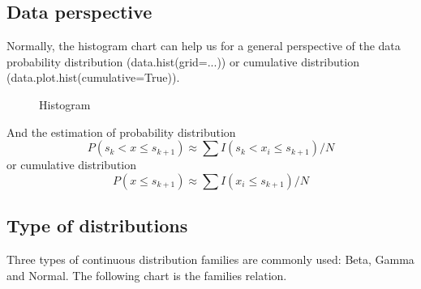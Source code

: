 \documentclass[UTF8]{article} %
\begin{document}
\subsection{Data perspective}
Normally, the histogram chart can help us for a general perspective of the data probability distribution (data.hist(grid=...)) or cumulative distribution (data.plot.hist(cumulative=True)).
\begin{figure}[htb]
\centering
{}
\caption{Histogram}
\label{fig:2}
\end{figure}
And the estimation of probability distribution
$$
P(s_k<x\leq s_{k+1})\approx \sum I(s_k<x_i\leq s_{k+1})/N
$$
or cumulative distribution
$$
P(x\leq s_{k+1})\approx\sum I(x_i\leq s_{k+1})/N
$$

\subsection{Type of distributions}
Three types of continuous distribution families are commonly used:  Beta, Gamma and Normal. The following chart is the families relation.
\thispagestyle{empty}
\end{document}

